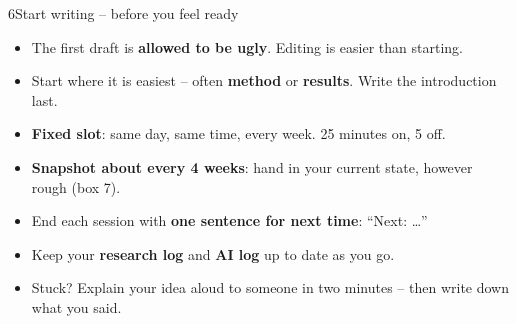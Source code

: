 \begin{wsbox}{6}{Start writing – before you feel ready}
\par\vspace{1.2mm}
\begin{minipage}[t]{0.5\linewidth}\vspace{0pt}
\begin{itemize}[itemsep=0.4mm]
\item The first draft is \textbf{allowed to be ugly}. Editing is easier than starting.
\item Start where it is easiest – often \textbf{method} or \textbf{results}. Write the introduction last.
\item \textbf{Fixed slot}: same day, same time, every week. 25 minutes on, 5 off.
\item \textbf{Snapshot about every 4 weeks}: hand in your current state, however rough (box 7).
\end{itemize}
\end{minipage}\hfill
\begin{minipage}[t]{0.47\linewidth}\vspace{0pt}
\begin{itemize}[itemsep=0.4mm]
\item End each session with \textbf{one sentence for next time}: “Next: …”
\item Keep your \textbf{research log} and \textbf{AI log} up to date as you go.
\item Stuck? Explain your idea aloud to someone in two minutes – then write down what you said.
\end{itemize}
\par\vspace{1mm}
\enspace\luecke[38mm]
\end{minipage}
\end{wsbox}

